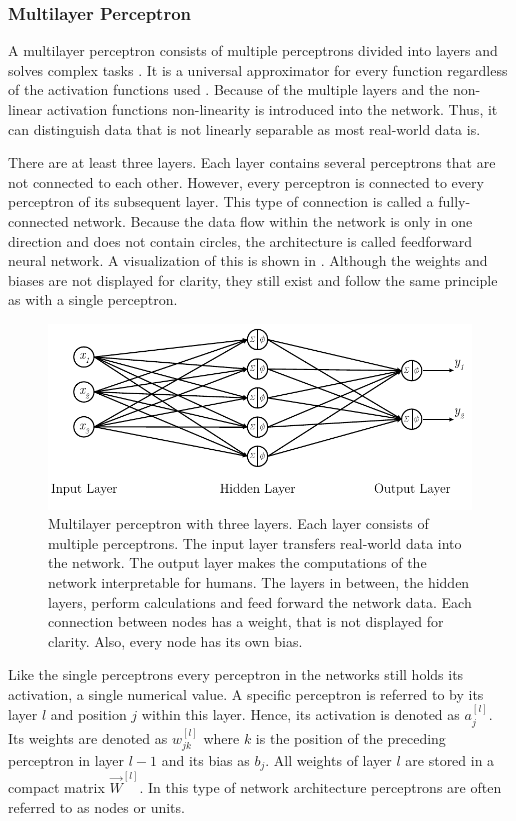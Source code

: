 \subsubsection{Multilayer Perceptron}
\label{sec:mlp-multilayer-perceptron}
A multilayer perceptron consists of multiple perceptrons divided into layers and solves complex tasks \cite{Bishop1995}.
It is a universal approximator for every function \cite{Cybenko1989} regardless of the activation functions used \cite{Hornik1991}.
Because of the multiple layers and the non-linear activation functions non-linearity is introduced into the network.
Thus, it can distinguish data that is not linearly separable as most real-world data is.

There are at least three layers.
Each layer contains several perceptrons that are not connected to each other.
However, every perceptron is connected to every perceptron of its subsequent layer.
This type of connection is called a fully-connected network.
Because the data flow within the network is only in one direction and does not contain circles, the architecture is called feedforward neural network.
A visualization of this is shown in .
Although the weights and biases are not displayed for clarity, they still exist and follow the same principle as with a single perceptron.
\begin{figure}
	\centering
	\includegraphics{images/multilayer-perceptron}
	\caption[Multilayer perceptron]{Multilayer perceptron with three layers. Each layer consists of multiple perceptrons. The input layer transfers real-world data into the network. The output layer makes the computations of the network interpretable for humans. The layers in between, the hidden layers, perform calculations and feed forward the network data. Each connection between nodes has a weight, that is not displayed for clarity. Also, every node has its own bias.}
	\label{fig:multilayer-perceptron}
\end{figure}
Like the single perceptrons every perceptron in the networks still holds its activation, a single numerical value.
A specific perceptron is referred to by its layer $l$ and position $j$ within this layer.
Hence, its activation is denoted as $a^{[l]}_{j}$.
Its weights are denoted as $w^{[l]}_{jk}$ where $k$ is the position of the preceding perceptron in layer $l-1$ and its bias as $b_j$.
All weights of layer $l$ are stored in a compact matrix $\vec{W}^{[l]}$.
In this type of network architecture perceptrons are often referred to as nodes or units.

